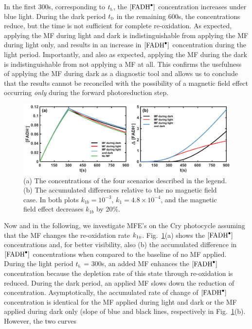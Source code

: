 \documentclass[twoside,twocolumn,9pt]{article}
\begin{document}
In the first 300s, corresponding to $t_{\textsc{l}}$, the $[\ce{FADH^{.}}]$ concentration increases under blue light. During the
dark period $t_{\textsc{d}}$ in the remaining 600s, the concentrations reduce, but the time is not sufficient for complete
re-oxidation. As expected, applying the MF during light and dark is indistinguishable from applying the MF during light only, and
results in an increase in $[\ce{FADH^{.}}]$ concentration during the light period. Importantly, and also as expected, applying the
MF during the dark is indistinguishable from not applying a MF at all. This confirms the usefulness of applying the MF during dark
as a diagnostic tool and allows us to conclude that the results \cite{Pooam2019} cannot be reconciled with the possibility of a
magnetic field effect occurring \emph{only} during the forward photoreduction step.
\begin{figure}[h]
	\centering
	\includegraphics{concAndAccDiff.pdf}
	\caption{(a) The concentrations of the four scenarios described in the legend. (b) The accumulated differences relative to the
		no magnetic field case. In both plots $k_{1b} = 10^{-3}$, $k_{1} = 4.8 \times 10^{-4}$, and the magnetic field effect
		decreases $k_{1b}$ by 20\%.}
	\label{fig:concAndAccDiff}
\end{figure}
Now and in the following, we investigate MFE's on the Cry photocycle assuming that the MF changes the re-oxidation rate
$k_{1\textsc{b}}$. Fig.~\ref{fig:concAndAccDiff}(a) shows the $[\ce{FADH^{.}}]$ concentrations and, for better visibility, also (b)
the accumulated difference in $[\ce{FADH^{.}}]$ concentrations when compared to the baseline of no MF applied. During the light
period $t_{\textsc{l}}$ = 300s, an added MF enhances the $[\ce{FADH^{.}}]$ concentration because the depletion rate of this state
through re-oxidation is reduced. During the dark period, an applied MF slows down the reduction of concentration. Asymptotically,
the accumulated rate of change of $[\ce{FADH^{.}}]$ concentration is identical for the MF applied during light and dark or the MF
applied during dark only (slope of blue and black lines, respectively in Fig.~\ref{fig:concAndAccDiff}(b). However, the two curves
\end{document}
